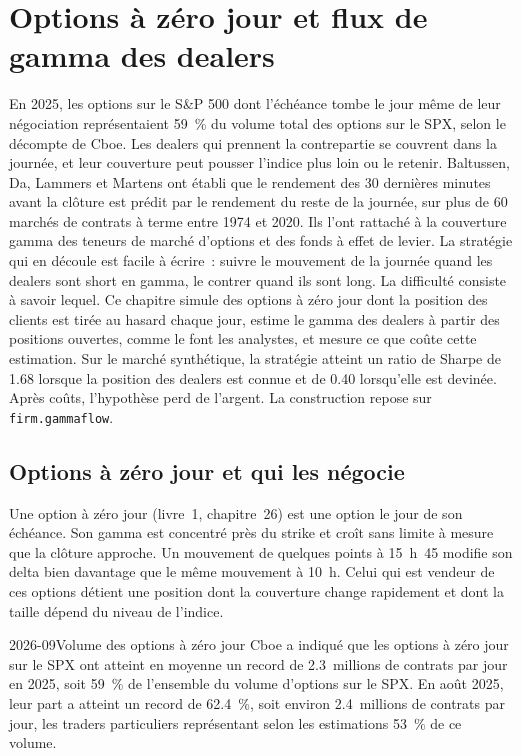\chapter{Options à zéro jour et flux de gamma des dealers}\label{ch:s2:zero-day-options-and-dealer-gamma-flows}

En 2025, les options sur le S\&P 500 dont l'échéance tombe le jour même de leur négociation représentaient 59~\% du volume total des options sur le SPX, selon le décompte de Cboe. Les dealers qui prennent la contrepartie
se couvrent dans la journée, et leur couverture peut pousser l'indice plus loin ou le retenir. Baltussen, Da, Lammers et Martens ont établi que le
rendement des 30 dernières minutes avant la clôture est prédit par le rendement du reste de la journée, sur plus de 60 marchés de contrats à terme entre 1974 et 2020. Ils l'ont rattaché
à la couverture gamma des teneurs de marché d'options et des fonds à effet de levier. La stratégie qui en découle est facile à écrire~: suivre le mouvement de la journée quand les dealers sont
short en gamma, le contrer quand ils sont long. La difficulté consiste à savoir lequel. Ce chapitre simule des options à zéro jour dont la position des clients est tirée au hasard chaque jour,
estime le gamma des dealers à partir des positions ouvertes, comme le font les analystes, et mesure ce que coûte cette estimation. Sur le marché synthétique, la stratégie atteint un ratio de Sharpe
de 1.68 lorsque la position des dealers est connue et de 0.40 lorsqu'elle est devinée. Après coûts, l'hypothèse perd de l'argent. La construction repose sur \texttt{firm.gammaflow}.

\section{Options à zéro jour et qui les négocie}

Une option à zéro jour (livre~1, chapitre~26) est une option le jour de son échéance. Son gamma est concentré près du strike et croît sans limite à mesure que la clôture
approche. Un mouvement de quelques points à 15~h~45 modifie son delta bien davantage que le même mouvement à 10~h. Celui qui est vendeur de ces options détient une
position dont la couverture change rapidement et dont la taille dépend du niveau de l'indice.

\begin{dated}{2026-09}{Volume des options à zéro jour}\label{dat:s2:zero-day-options-and-dealer-gamma-flows:volume}
Cboe a indiqué que les options à zéro jour sur le SPX ont atteint en moyenne un record de 2.3~millions de contrats par jour en 2025, soit 59~\% de l'ensemble du volume d'options sur le SPX. En août 2025, leur
part a atteint un record de 62.4~\%, soit environ 2.4~millions de contrats par jour, les traders particuliers représentant selon les estimations 53~\% de ce volume.
\end{dated}

